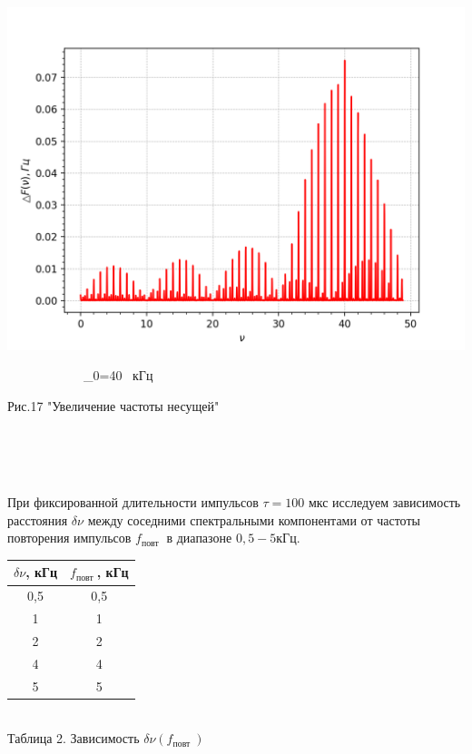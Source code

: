 \documentclass[a4paper,12pt]{article} %
\begin{document}
\begin{minipage}{0.05\textwidth}
\begin{center}
\ \ \Rightarrow
\end{center}
\end{minipage}
\begin{minipage}{0.3\textwidth}
\includegraphics[width=\linewidth]{8.png}\\
\begin{center}
\ \ \ \ \ \ \ \ \ \ \ \ \nu_{0}=40 \ кГц
\end{center}
\end{minipage}

\begin{center}
{Рис.17} "Увеличение частоты несущей"
\end{center}
\\
\
\\
\

При фиксированной длительности импульсов $\tau=100$ мкс исследуем зависимость расстояния $\delta \nu$ между соседними спектральными компонентами от частоты повторения импульсов $f_{\text {повт }}$ в диапазоне $0,5-5 кГц$.

\begin{center}
\begin{tabular}{|c|c|}
\hline
$\delta \nu$, кГц & $f_{\text {повт }}$, кГц \\ \hline
0,5 & 0,5 \\ \hline
1 & 1 \\ \hline
2 & 2 \\ \hline
4 & 4 \\ \hline
5 & 5 \\ \hline
\end{tabular}\\
{Таблица 2.} Зависимость $\delta \nu(f_{\text {повт }})$
\end{center}
\end{document}
